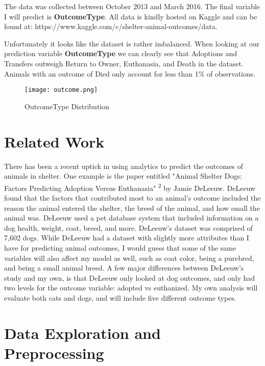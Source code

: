 \documentclass[12pt]{article} %
\begin{document}
The data was collected between October 2013 and March 2016. The final variable I will predict is \textbf{OutcomeType}. All data is kindly hosted on Kaggle and can be found at: https://www.kaggle.com/c/shelter-animal-outcomes/data. 

Unfortunately it looks like the dataset is rather imbalanced. When looking at our prediction variable \textbf{OutcomeType} we can clearly see that Adoptions and Transfers outweigh Return to Owner, Euthanasia, and Death in the dataset. Animals with an outcome of Died only account for less than 1\% of observations. 

\begin{figure}[!htb]
  \centering
  \texttt{[image: outcome.png]}                  
  \caption{OutcomeType Distribution}
  \label{fig:OutcomeType}
\end{figure}



\newpage

\section{Related Work}
There has been a recent uptick in using analytics to predict the outcomes of animals in shelter. One example is the paper entitled "Animal Shelter Dogs: Factors Predicting Adoption Versus Euthanasia" \textsuperscript{2} by Jamie DeLeeuw. DeLeeuw found that the factors that contributed most to an animal's outcome included the reason the animal entered the shelter, the breed of the animal, and how small the animal was. DeLeeuw used a pet database system that included information on a dog health, weight, coat, breed, and more. DeLeeuw's dataset was comprised of 7,602 dogs. While DeLeeuw had a dataset with slightly more attributes than I have for predicting animal outcomes, I would guess that some of the same variables will also affect my model as well, such as coat color, being a purebred, and being a small animal breed. A few major differences between DeLeeuw's study and my own, is that DeLeeuw only looked at dog outcomes, and only had two levels for the outcome variable: adopted vs euthanized. My own analysis will evaluate both cats and dogs, and will include five different outcome types. 


\section{Data Exploration and Preprocessing}
\end{document}
